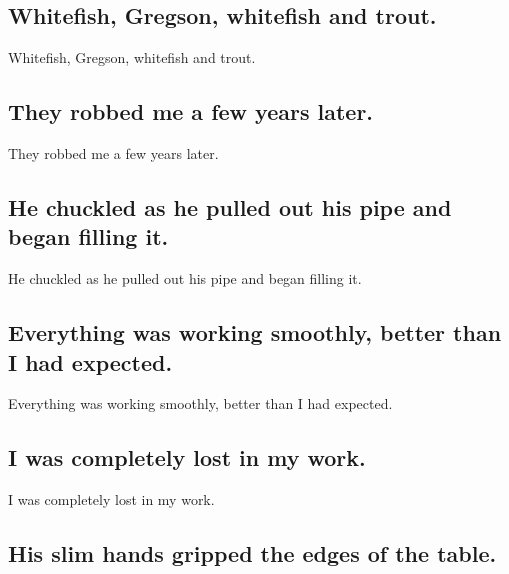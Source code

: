 \documentclass[]{article}
\begin{document}
\hypertarget{whitefish-gregson-whitefish-and-trout.}{%
\subsection{Whitefish, Gregson, whitefish and
trout.}\label{whitefish-gregson-whitefish-and-trout.}}

Whitefish, Gregson, whitefish and trout.

\hypertarget{they-robbed-me-a-few-years-later.}{%
\subsection{They robbed me a few years
later.}\label{they-robbed-me-a-few-years-later.}}

They robbed me a few years later.

\hypertarget{he-chuckled-as-he-pulled-out-his-pipe-and-began-filling-it.}{%
\subsection{He chuckled as he pulled out his pipe and began filling
it.}\label{he-chuckled-as-he-pulled-out-his-pipe-and-began-filling-it.}}

He chuckled as he pulled out his pipe and began filling it.

\hypertarget{everything-was-working-smoothly-better-than-i-had-expected.}{%
\subsection{Everything was working smoothly, better than I had
expected.}\label{everything-was-working-smoothly-better-than-i-had-expected.}}

Everything was working smoothly, better than I had expected.

\hypertarget{i-was-completely-lost-in-my-work.}{%
\subsection{I was completely lost in my
work.}\label{i-was-completely-lost-in-my-work.}}

I was completely lost in my work.

\hypertarget{his-slim-hands-gripped-the-edges-of-the-table.}{%
\subsection{His slim hands gripped the edges of the
table.}\label{his-slim-hands-gripped-the-edges-of-the-table.}}
\end{document}
